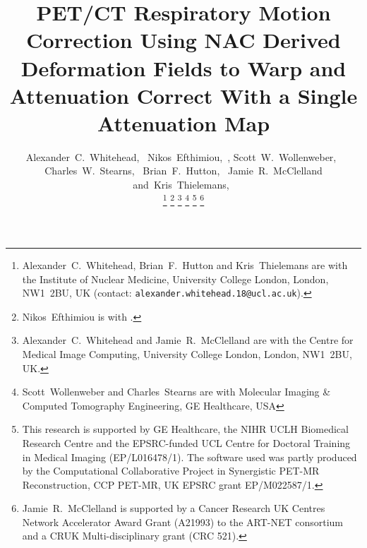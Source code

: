 \documentclass[10pt, twocolumn, twoside, letterpaper]{IEEEtran}
\begin{document}
\title{PET/CT Respiratory Motion Correction Using NAC Derived Deformation Fields to Warp and Attenuation Correct With a Single Attenuation Map}

\pagestyle{plain}

\author{Alexander~C.~Whitehead,~
        Nikos~Efthimiou,~,
        Scott~W.~Wollenweber,~
        Charles~W.~Stearns,~
        Brian~F.~Hutton,~
        Jamie~R.~McClelland
        and~Kris~Thielemans,~%

    \thanks{Alexander~C.~Whitehead, Brian~F.~Hutton and Kris~Thielemans are with the Institute of Nuclear Medicine, University College London, London, NW1~2BU, UK (contact: \texttt{alexander.whitehead.18@ucl.ac.uk}).}%
    \thanks{Nikos~Efthimiou is with .}%
    \thanks{Alexander~C.~Whitehead and Jamie~R.~McClelland are with the Centre for Medical Image Computing, University College London, London, NW1~2BU, UK.}%
    \thanks{Scott~Wollenweber and Charles~Stearns are with Molecular Imaging \& Computed Tomography Engineering, GE Healthcare, USA}%
    \thanks{This research is supported by GE Healthcare, the NIHR UCLH Biomedical Research Centre and the EPSRC-funded UCL Centre for Doctoral Training in Medical Imaging (EP/L016478/1). The software used was partly produced by the Computational Collaborative Project in Synergistic PET-MR Reconstruction, CCP PET-MR, UK EPSRC grant EP/M022587/1.}%
    \thanks{Jamie~R.~McClelland is supported by a Cancer Research UK Centres Network Accelerator Award Grant (A21993) to the ART-NET consortium and a CRUK Multi-disciplinary grant (CRC 521).}%
}

\maketitle
\IEEEpeerreviewmaketitle
\end{document}
